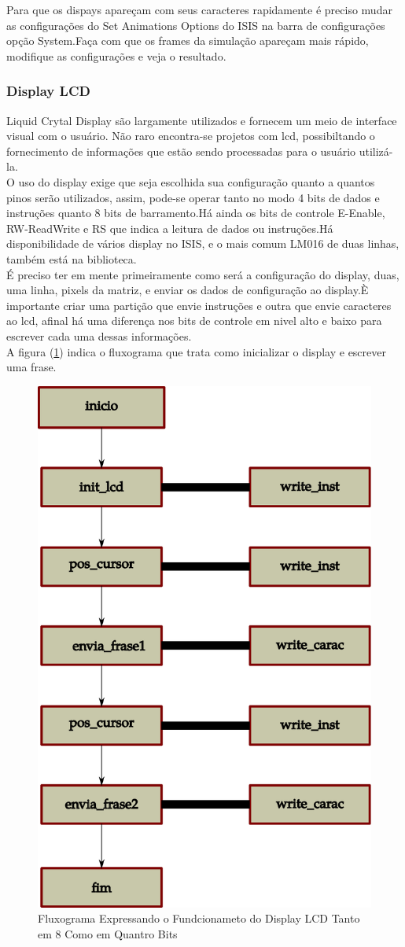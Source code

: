 \documentclass{Fabiano_file}
\begin{document}
{Para que os dispays apareçam com seus caracteres rapidamente é preciso mudar as configurações do Set Animations Options do ISIS na barra  de configurações 
opção System.Faça com que os frames da simulação apareçam mais rápido, modifique as configurações e veja o resultado.

\newpage

\subsubsection{Display LCD}
Liquid Crytal Display são largamente utilizados e fornecem um meio de interface visual com o usuário. Não raro encontra-se projetos com lcd, possibiltando 
o fornecimento de informações que estão sendo processadas para o usuário utilizá-la.\\

O uso do display exige que seja escolhida sua configuração quanto a quantos pinos serão utilizados, assim, pode-se operar tanto no modo 4 bits de dados e 
instruções quanto 8 bits de barramento.Há ainda os bits de controle E-Enable, RW-ReadWrite e RS que indica a leitura de dados ou instruções.Há disponibilidade
de vários display no ISIS, e o mais comum LM016 de duas linhas, também está na biblioteca.\\
	
É preciso ter em mente primeiramente como será a configuração do display, duas, uma linha, pixels da matriz, e enviar os dados de configuração ao display.È
importante criar uma partição que envie instruções e outra que envie caracteres ao lcd, afinal há uma diferença nos bits de controle em nivel alto e baixo
para escrever cada uma dessas informações.\\
A figura (\ref{fig:fluoxograma_lcd_crystal_liquid}) indica o fluxograma que trata como inicializar o display e escrever uma frase.

\begin{figure}[h!]
\centering
\includegraphics[width=.5\textwidth]{fluoxograma_lcd_crystal_liquid.pdf}
\caption{Fluxograma Expressando o Fundcionameto do Display LCD Tanto em 8 Como em Quantro Bits}
\label{fig:fluoxograma_lcd_crystal_liquid}
\end{figure}

}
\end{document}
